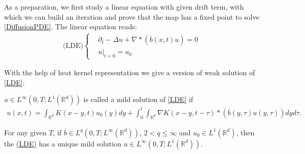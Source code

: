 \vskip5mm
As a preparation, we first study a linear equation with given drift term, with which we can build an iteration and prove that the map has a fixed point to solve \autoref{DiffusionPDE}. The linear equation reads:
\begin{align}\label{LDE}
  \text{(LDE)}\begin{cases}
    &\partial_t - \Delta u + \nabla * (\overline{b}(x,t)u ) = 0 \\ 
    & u \rvert_{t=0} = u_{0}
  \end{cases}
\end{align}

With the help of heat kernel representation we give a version of weak solution of \autoref{LDE}:
\begin{Definition}
	 $u \in L^{\infty}(0,T;L^{1}(\mathbb{R}^{d} ) ) $ is called a mild solution of \autoref{LDE} if
	 \begin{align*}
	u(x,t) = \int_{\mathbb{R}^{d} }K(x-y,t)u_{0}(y) dy  + \int_{0}^{t} \int_{\mathbb{R}^{d} } \nabla K(x-y,t-\tau ) * (\overline{b}(y,\tau )u(y,\tau ) ) dy d\tau 
	.\end{align*} 
\end{Definition}
\begin{theorem}\label{bLDE}
 For any given $T$, if $\overline{b} \in  L^q(0,T;L^\infty( \mathbb{R}^{d} )) $, $2<q\leq\infty$  and $u_{0} \in  L^1(\mathbb{R}^{d} )$, then the \hyperref[LDE]{(LDE)} has a 
  unique mild solution $u \in L^{\infty}(0,T;L^{1}(\mathbb{R}^{d} ) ) $. 
\end{theorem}

